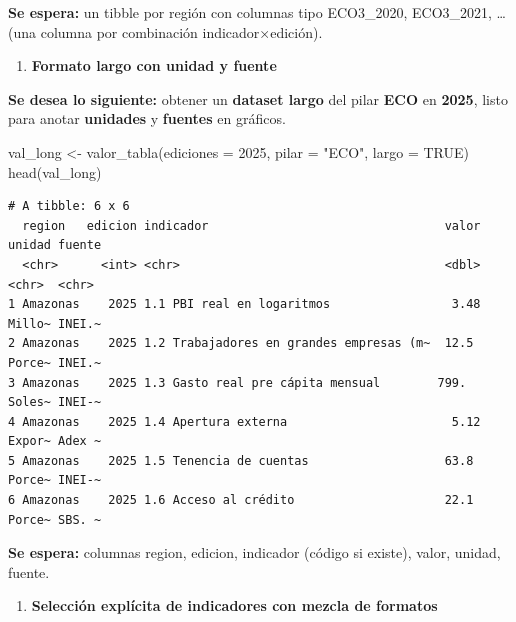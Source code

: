 \documentclass[
  11pt,
  letterpaper,
  DIV=11,
  numbers=noendperiod]{scrartcl}
\newenvironment{Shaded}{\begin{snugshade}}{\end{snugshade}}
\newcommand{\AttributeTok}[1]{\textcolor[rgb]{0.40,0.45,0.13}{#1}}
\newcommand{\ConstantTok}[1]{\textcolor[rgb]{0.56,0.35,0.01}{#1}}
\newcommand{\DecValTok}[1]{\textcolor[rgb]{0.68,0.00,0.00}{#1}}
\newcommand{\FunctionTok}[1]{\textcolor[rgb]{0.28,0.35,0.67}{#1}}
\newcommand{\NormalTok}[1]{\textcolor[rgb]{0.00,0.23,0.31}{#1}}
\newcommand{\OtherTok}[1]{\textcolor[rgb]{0.00,0.23,0.31}{#1}}
\newcommand{\StringTok}[1]{\textcolor[rgb]{0.13,0.47,0.30}{#1}}
\providecommand{\tightlist}{%
  \setlength{\itemsep}{0pt}\setlength{\parskip}{0pt}}\usepackage{longtable,booktabs,array}
\begin{document}
\textbf{Se espera:} un tibble por región con columnas tipo ECO3\_2020,
ECO3\_2021, \ldots{} (una columna por combinación indicador×edición).

\begin{enumerate}
\def\labelenumi{\arabic{enumi}.}
\setcounter{enumi}{1}
\tightlist
\item
  \textbf{Formato largo con unidad y fuente}
\end{enumerate}

\textbf{Se desea lo siguiente:} obtener un \textbf{dataset largo} del
pilar \textbf{ECO} en \textbf{2025}, listo para anotar \textbf{unidades}
y \textbf{fuentes} en gráficos.

\begin{Shaded}
\begin{Highlighting}[]
\NormalTok{val\_long }\OtherTok{\textless{}{-}} \FunctionTok{valor\_tabla}\NormalTok{(}\AttributeTok{ediciones =} \DecValTok{2025}\NormalTok{, }
                        \AttributeTok{pilar =} \StringTok{"ECO"}\NormalTok{, }
                        \AttributeTok{largo =} \ConstantTok{TRUE}\NormalTok{)}
\FunctionTok{head}\NormalTok{(val\_long)}
\end{Highlighting}
\end{Shaded}

\begin{verbatim}
# A tibble: 6 x 6
  region   edicion indicador                                 valor unidad fuente
  <chr>      <int> <chr>                                     <dbl> <chr>  <chr> 
1 Amazonas    2025 1.1 PBI real en logaritmos                 3.48 Millo~ INEI.~
2 Amazonas    2025 1.2 Trabajadores en grandes empresas (m~  12.5  Porce~ INEI.~
3 Amazonas    2025 1.3 Gasto real pre cápita mensual        799.   Soles~ INEI-~
4 Amazonas    2025 1.4 Apertura externa                       5.12 Expor~ Adex ~
5 Amazonas    2025 1.5 Tenencia de cuentas                   63.8  Porce~ INEI-~
6 Amazonas    2025 1.6 Acceso al crédito                     22.1  Porce~ SBS. ~
\end{verbatim}

\textbf{Se espera:} columnas region, edicion, indicador (código si
existe), valor, unidad, fuente.

\begin{enumerate}
\def\labelenumi{\arabic{enumi}.}
\setcounter{enumi}{2}
\tightlist
\item
  \textbf{Selección explícita de indicadores con mezcla de formatos}
\end{enumerate}
\end{document}
